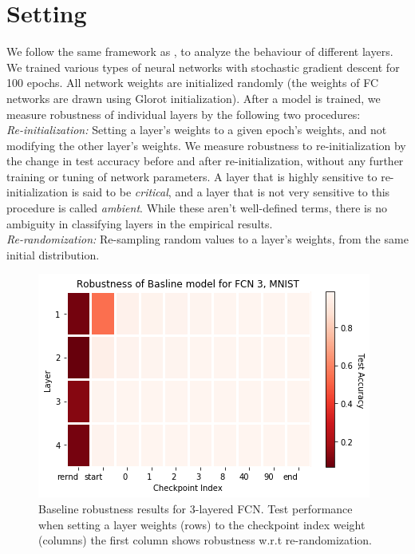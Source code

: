 \documentclass{article}
\begin{document}
\section{Setting} \label{setting}
We follow the same framework as \cite{allLayers}, to analyze the behaviour of different layers. We trained various types of neural networks with stochastic gradient descent for 100 epochs. All network weights are initialized randomly (the weights of FC networks are drawn using Glorot initialization). After a model is trained, we measure robustness of individual layers by the following two procedures:\\
\emph{Re-initialization:} Setting a layer's weights to a given epoch's weights, and not modifying the other layer's weights. We measure robustness to re-initialization by the change in test accuracy before and after re-initialization, without any further training or tuning of network parameters. A layer that is highly sensitive to re-initialization is said to be \emph{critical}, and a layer that is not very sensitive to this procedure is called \emph{ambient}. While these aren't well-defined terms, there is no ambiguity in classifying layers in the empirical results. \\
\emph{Re-randomization:} Re-sampling random values to a layer's weights, from the same initial distribution. \\
\begin{figure}
  \includegraphics[width=\linewidth]{images/baseline_fc3_mnist_heatmap.png}
  \caption{Baseline robustness results for 3-layered FCN. Test performance when setting a layer weights (rows) to the checkpoint index weight (columns) the first column shows robustness w.r.t re-randomization.}
  \label{fig:baseline_fc3_heatmap}
\end{figure}
\end{document}
